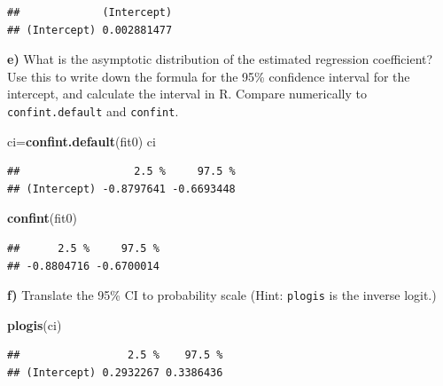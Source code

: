 \documentclass[
]{article}
\newenvironment{Shaded}{\begin{snugshade}}{\end{snugshade}}
\newcommand{\FunctionTok}[1]{\textcolor[rgb]{0.13,0.29,0.53}{\textbf{#1}}}
\newcommand{\NormalTok}[1]{#1}
\newcommand{\OtherTok}[1]{\textcolor[rgb]{0.56,0.35,0.01}{#1}}
\newcommand{\SpecialCharTok}[1]{\textcolor[rgb]{0.81,0.36,0.00}{\textbf{#1}}}
\begin{document}
\begin{verbatim}
##             (Intercept)
## (Intercept) 0.002881477
\end{verbatim}

\textbf{e)} What is the asymptotic distribution of the estimated
regression coefficient? Use this to write down the formula for the 95\%
confidence interval for the intercept, and calculate the interval in R.
Compare numerically to \texttt{confint.default} and \texttt{confint}.

\begin{Shaded}
\begin{Highlighting}[]
\NormalTok{ci}\OtherTok{=}\FunctionTok{confint.default}\NormalTok{(fit0)}
\NormalTok{ci}
\end{Highlighting}
\end{Shaded}

\begin{verbatim}
##                  2.5 %     97.5 %
## (Intercept) -0.8797641 -0.6693448
\end{verbatim}

\begin{Shaded}
\begin{Highlighting}[]
\FunctionTok{confint}\NormalTok{(fit0)}
\end{Highlighting}
\end{Shaded}

\begin{verbatim}
##      2.5 %     97.5 % 
## -0.8804716 -0.6700014
\end{verbatim}

\textbf{f)} Translate the 95\% CI to probability scale (Hint:
\texttt{plogis} is the inverse logit.)

\begin{Shaded}
\begin{Highlighting}[]
\FunctionTok{plogis}\NormalTok{(ci)}
\end{Highlighting}
\end{Shaded}

\begin{verbatim}
##                 2.5 %    97.5 %
## (Intercept) 0.2932267 0.3386436
\end{verbatim}

\begin{Shaded}
\end{Shaded}
\end{document}
